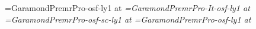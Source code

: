 \def\romantext{GaramondPremrPro-osf-ly1 }
\def\italictext{GaramondPremrPro-It-osf-ly1 }
\def\smallcaptext{GaramondPremrPro-osf-sc-ly1 }
\def\romantitlingtext{GaramondPremrPro-lf-titling-ly1 }
\def\romantitlingdisplay{GaramondPremrPro-Disp-lf-titling-ly1 }

\font\rm=\romantext at \textsize
\font\it=\italictext at \textsize
\font\sc=\smallcaptext at \textsize
\font\fineprint=\romantext at \smalltextsize

%
%

\def\useemptypageframe{
  \global\headline={\line{}}
  \global\footline={\line{}}
  \global\@cleared@pagefalse
  \global\@display@pagefalse
}

\def\usedisplaypageframe{\@display@pagetrue\@cleared@pagefalse}

\def\usenormalpageframe{
  \global\headline={\runningheaderfont\normalpageheadline}
  \global\footline={\runningheaderfont\normalpagefootline}
  \global\@cleared@pagefalse
  \global\@display@pagefalse
}

\def\displaypagefootline{\runningheaderfont\hfil\folio\hfil}
\def\normalpageheadline{\ifodd\pageno\normaloddpageheadline\else\normalevenpageheadline\fi}
\def\normalpagefootline{\line{}}
\def\normaloddpageheadline{\title\hfil\folio}
\def\normalevenpageheadline{\folio\hfil\author}


%
%

\def\nextpage{\vfil\eject\global\@cleared@pagetrue\global\@display@pagefalse\relax}
\def\nextoddpage{\nextpage\ifodd\pageno \else \line{}\nextpage\fi}
\def\nextevenpage{\nextpage\ifodd\pageno \line{}\nextpage\else \fi}

\def\titlepage#1#2#3{
  \nextoddpage
  \useemptypageframe
  \baselinebox{\booktitle{#1}}{10}{0}
  \baselinebox{\authorname{#2}}{6}{6}
  \rightline{#3}
  \eject
}

\def\previewannouncementpage#1{
  \nextoddpage
  \line{}\vfill
  \centerline{\linelogo{20pt}}
  \vskip\baselineskip
  \centerline{\rm proudly announces}
  \vfill
  {\booktitlefont\centered #1\par}
  \vskip\baselineskip
  \centerline{by}
  \vskip\baselineskip
  \centerline{\authornamefont\author}
  \vfill
  \centerline{Turn the page for a preview}
  \vfill
}
\def\previewpage#1{
  \nextoddpage
  \baselinebox{\chaptertitle{#1}}{10}{}
  \useemptypageframe
}

